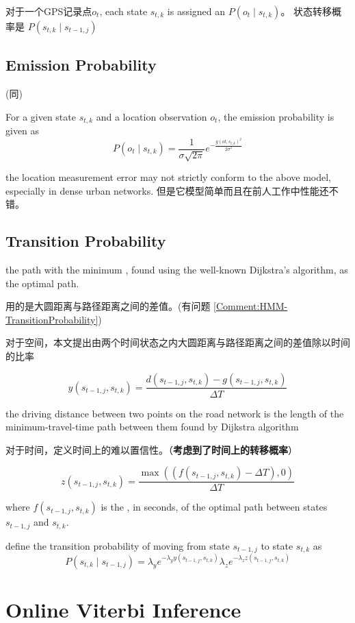 对于一个GPS记录点$ o_{t} $, each state $ s_{t, k} $ is assigned an  $ P\left(o_{t} \mid s_{t, k}\right) $。 状态转移概率是 $ P\left(s_{t, k} \mid s_{t-1, j}\right) $

\subsection{Emission Probability}

(同\cite{newson2009hidden})

For a given state $ s_{t, k} $ and a location observation $ o_{t} $, the emission probability is given as
$$
P\left(o_{t} \mid s_{t, k}\right)=\frac{1}{\sigma \sqrt{2 \pi}} e^{-\frac{g\left(o t, s_{t, k}\right)^{2}}{2 \sigma^{2}}}
$$

\begin{remark}
    the location measurement error may not strictly conform to the above model, especially in dense urban networks. 但是它模型简单而且在前人工作中性能还不错。
\end{remark}

\subsection{Transition Probability}

the path with the minimum , found using
the well-known Dijkstra’s algorithm, as the optimal path.

\cite{newson2009hidden}用的是大圆距离与路径距离之间的差值。(有问题 \ref{Comment:HMM-TransitionProbability})

对于空间，本文提出由两个时间状态之内大圆距离与路径距离之间的差值除以时间的比率

$$ y\left(s_{t-1, j}, s_{t, k}\right)=\frac{d\left(s_{t-1, j}, s_{t, k}\right)-g\left(s_{t-1, j}, s_{t, k}\right)}{\Delta T} $$

the driving distance
between two points on the road network is the length of the
minimum-travel-time path between them found by Dijkstra
algorithm

对于时间，定义时间上的难以置信性。（\textbf{考虑到了时间上的转移概率}）

$$
z\left(s_{t-1, j}, s_{t, k}\right)=\frac{\max \left(\left(f\left(s_{t-1, j}, s_{t, k}\right)-\Delta T\right), 0\right)}{\Delta T}
$$

where $ f\left(s_{t-1, j}, s_{t, k}\right) $ is the , in seconds, of the optimal path between states $ s_{t-1, j} $ and $ s_{t, k} $.

define the transition probability of moving from state $ s_{t-1, j} $ to state $ s_{t, k} $ as
$$
P\left(s_{t, k} \mid s_{t-1, j}\right)=\lambda_{y} e^{-\lambda_{y} y\left(s_{t-1, j}, s_{t, k}\right)} \lambda_{z} e^{-\lambda_{z} z\left(s_{t-1, j}, s_{t, k}\right)}
$$

\section{Online Viterbi Inference}